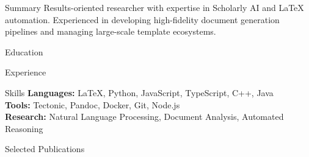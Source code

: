 \documentclass{cv}
\author{John Doe}
\begin{document}

\begin{cvsection}{Summary}
Results-oriented researcher with expertise in Scholarly AI and LaTeX automation. Experienced in developing high-fidelity document generation pipelines and managing large-scale template ecosystems.
\end{cvsection}

\begin{cvsection}{Education}
\end{cvsection}

\begin{cvsection}{Experience}
\end{cvsection}

\begin{cvsection}{Skills}
\textbf{Languages:} LaTeX, Python, JavaScript, TypeScript, C++, Java\\
\textbf{Tools:} Tectonic, Pandoc, Docker, Git, Node.js\\
\textbf{Research:} Natural Language Processing, Document Analysis, Automated Reasoning
\end{cvsection}

\begin{cvsection}{Selected Publications}
\nocite{*}


\end{cvsection}
\end{document}
